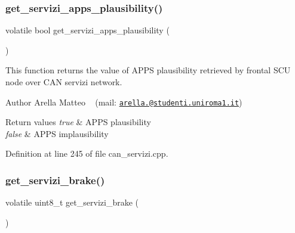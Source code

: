 \mbox{\label{group___c_a_n__servizi__group_ga66135a8978149fc6fa0b62446131ce95}} 
\subsubsection{\texorpdfstring{get\+\_\+servizi\+\_\+apps\+\_\+plausibility()}{get\_servizi\_apps\_plausibility()}}
{\footnotesize\ttfamily volatile bool get\+\_\+servizi\+\_\+apps\+\_\+plausibility (\begin{DoxyParamCaption}{ }\end{DoxyParamCaption})}



This function returns the value of A\+P\+PS plausibility retrieved by frontal S\+CU node over C\+AN servizi network. 

\begin{DoxyAuthor}{Author}
Arella Matteo ~\newline
 (mail\+: \href{mailto:arella.1646983@studenti.uniroma1.it}{\tt arella.@studenti.\+uniroma1.\+it})
\end{DoxyAuthor}

\begin{DoxyRetVals}{Return values}
{\em true} & A\+P\+PS plausibility \\
\hline
{\em false} & A\+P\+PS implausibility \\
\hline
\end{DoxyRetVals}


Definition at line 245 of file can\+\_\+servizi.\+cpp.

\mbox{\label{group___c_a_n__servizi__group_ga21c09880bef645f24962658ef3dbb16e}} 
\subsubsection{\texorpdfstring{get\+\_\+servizi\+\_\+brake()}{get\_servizi\_brake()}}
{\footnotesize\ttfamily volatile uint8\+\_\+t get\+\_\+servizi\+\_\+brake (\begin{DoxyParamCaption}{ }\end{DoxyParamCaption})}



